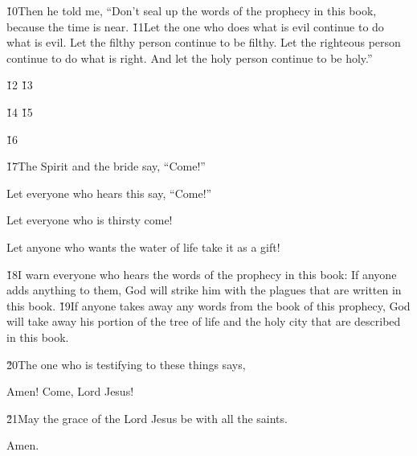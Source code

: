 \v{10}Then he told me, ``Don't seal up the words of the prophecy in this book, because the time is near. \v{11}Let the one who does what is evil continue to do what is evil. Let the filthy person continue to be filthy. Let the righteous person continue to do what is right. And let the holy person continue to be holy.''

\v{12} \v{13}

\v{14}  \v{15}

\v{16}

\v{17}The Spirit and the bride say, ``Come!''

Let everyone who hears this say, ``Come!''

Let everyone who is thirsty come!

Let anyone who wants the water of life take it as a gift!

\v{18}I warn everyone who hears the words of the prophecy in this book: If anyone adds anything to them, God will strike him with the plagues that are written in this book. \v{19}If anyone takes away any words from the book of this prophecy, God will take away his portion of the tree of life and the holy city that are described in this book.

\v{20}The one who is testifying to these things says, 

Amen! Come, Lord Jesus!

\v{21}May the grace of the Lord Jesus be with all the saints.

Amen.
